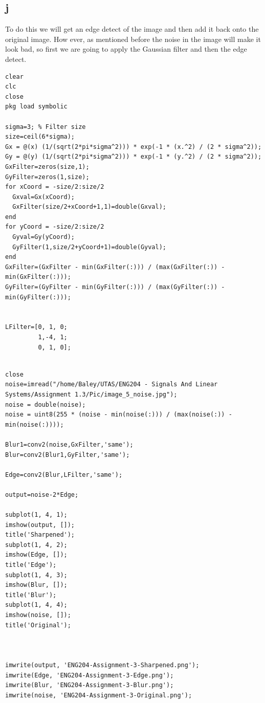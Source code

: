\documentclass[11pt]{article}
\begin{document}
\subsection{j}
\label{sec:org8ac588e}
To do this we will get an edge detect of the image and then add it back onto the original image. How ever, as mentioned before the noise in the image will make it look bad, so first we are going to apply the Gaussian filter and then the edge detect.
\begin{verbatim}
clear
clc
close
pkg load symbolic

sigma=3; % Filter size
size=ceil(6*sigma);
Gx = @(x) (1/(sqrt(2*pi*sigma^2))) * exp(-1 * (x.^2) / (2 * sigma^2));
Gy = @(y) (1/(sqrt(2*pi*sigma^2))) * exp(-1 * (y.^2) / (2 * sigma^2));
GxFilter=zeros(size,1);
GyFilter=zeros(1,size);
for xCoord = -size/2:size/2
  Gxval=Gx(xCoord);
  GxFilter(size/2+xCoord+1,1)=double(Gxval);
end
for yCoord = -size/2:size/2
  Gyval=Gy(yCoord);
  GyFilter(1,size/2+yCoord+1)=double(Gyval);
end
GxFilter=(GxFilter - min(GxFilter(:))) / (max(GxFilter(:)) - min(GxFilter(:)));
GyFilter=(GyFilter - min(GyFilter(:))) / (max(GyFilter(:)) - min(GyFilter(:)));


LFilter=[0, 1, 0;
         1,-4, 1;
         0, 1, 0];


\end{verbatim}


\begin{verbatim}
close
noise=imread("/home/Baley/UTAS/ENG204 - Signals And Linear Systems/Assignment 1.3/Pic/image_5_noise.jpg");
noise = double(noise);
noise = uint8(255 * (noise - min(noise(:))) / (max(noise(:)) - min(noise(:))));

Blur1=conv2(noise,GxFilter,'same');
Blur=conv2(Blur1,GyFilter,'same');

Edge=conv2(Blur,LFilter,'same');

output=noise-2*Edge;

subplot(1, 4, 1);
imshow(output, []);
title('Sharpened');
subplot(1, 4, 2);
imshow(Edge, []);
title('Edge');
subplot(1, 4, 3);
imshow(Blur, []);
title('Blur');
subplot(1, 4, 4);
imshow(noise, []);
title('Original');



imwrite(output, 'ENG204-Assignment-3-Sharpened.png');
imwrite(Edge, 'ENG204-Assignment-3-Edge.png');
imwrite(Blur, 'ENG204-Assignment-3-Blur.png');
imwrite(noise, 'ENG204-Assignment-3-Original.png');

\end{verbatim}
\end{document}
